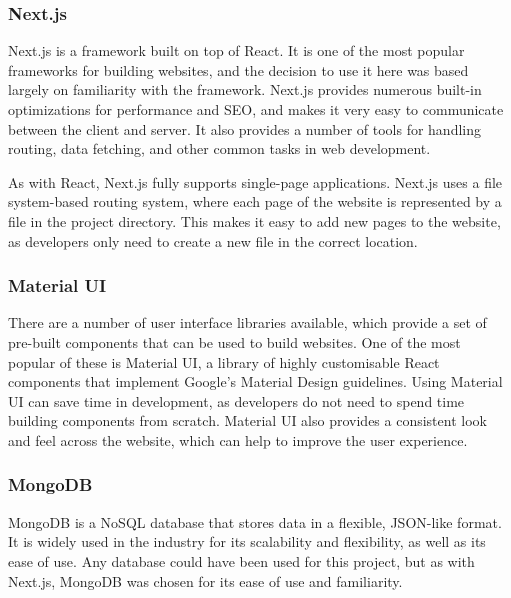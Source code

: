 \documentclass[../main.tex]{subfiles}
\begin{document}
            \subsubsection{Next.js}
                Next.js is a framework built on top of React.
                It is one of the most popular frameworks for building websites, and the
                    decision to use it here was based largely on familiarity with the framework.
                Next.js provides numerous built-in optimizations for performance and SEO, and
                    makes it very easy to communicate between the client and server.
                It also provides a number of tools for handling routing, data fetching, and
                    other common tasks in web development.

                As with React, Next.js fully supports single-page applications.
                Next.js uses a file system-based routing system, where each page of the website
                    is represented by a file in the project directory.
                This makes it easy to add new pages to the website, as developers only need to
                    create a new file in the correct location.

            \subsubsection{Material UI}
                There are a number of user interface libraries available, which provide a set
                    of pre-built components that can be used to build websites.
                One of the most popular of these is Material UI, a library of highly
                    customisable React components that implement Google's Material Design
                    guidelines.
                Using Material UI can save time in development, as developers do not need to
                    spend time building components from scratch.
                Material UI also provides a consistent look and feel across the website, which
                    can help to improve the user experience.

            \subsubsection{MongoDB}
                MongoDB is a NoSQL database that stores data in a flexible, JSON-like format.
                It is widely used in the industry for its scalability and flexibility, as well
                    as its ease of use.
                Any database could have been used for this project, but as with Next.js,
                    MongoDB was chosen for its ease of use and familiarity.
\end{document}
